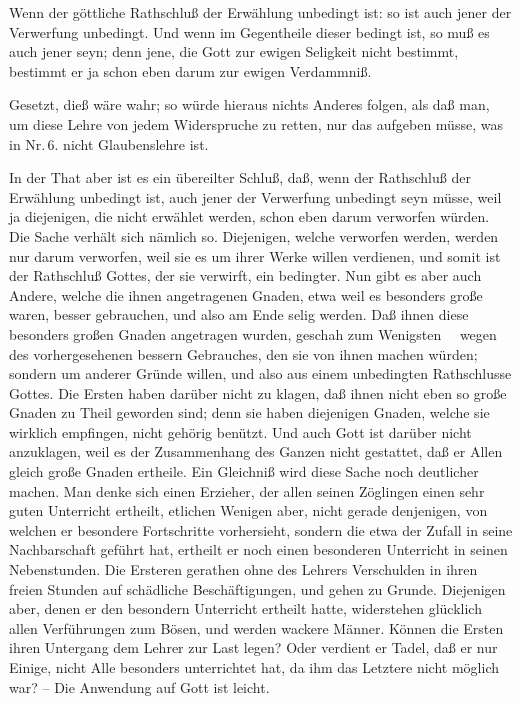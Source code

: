  Wenn der göttliche Rathschluß der Erwählung unbedingt ist: so ist auch jener der Verwerfung unbedingt. Und wenn im Gegentheile dieser bedingt ist, so muß es auch jener seyn; denn jene, die Gott zur ewigen Seligkeit nicht bestimmt, bestimmt er ja schon eben darum zur ewigen Verdammniß.\par
{} 
\begin{aufzb}[1.]
\item Gesetzt, dieß wäre wahr; so würde hieraus nichts Anderes folgen, als daß man, um diese Lehre von jedem Widerspruche zu retten, nur das aufgeben müsse, was in Nr.\,6. nicht Glaubenslehre ist.
\item In der That aber ist es ein übereilter Schluß, daß, wenn der Rathschluß der Erwählung unbedingt ist, auch jener der Verwerfung unbedingt seyn müsse, weil ja diejenigen, die nicht erwählet werden, schon eben darum verworfen würden. Die Sache verhält sich nämlich so. Diejenigen, welche verworfen werden, werden nur darum verworfen, weil sie es um ihrer Werke willen verdienen, und somit ist der Rathschluß Gottes, der sie verwirft, ein bedingter. Nun gibt es aber auch Andere, welche die ihnen angetragenen Gnaden, etwa weil es besonders große waren, besser gebrauchen, und also am Ende selig werden. Daß ihnen diese besonders großen Gnaden angetragen wurden, geschah zum Wenigsten ~\ wegen des vorhergesehenen bessern Gebrauches, den sie von ihnen machen würden; sondern um anderer Gründe willen, und also aus einem unbedingten Rathschlusse Gottes. Die Ersten haben darüber nicht zu klagen, daß ihnen nicht eben so große Gnaden zu Theil geworden sind; denn sie haben diejenigen Gnaden, welche sie wirklich empfingen, nicht gehörig benützt. Und auch Gott ist darüber nicht anzuklagen, weil es der Zusammenhang des Ganzen nicht gestattet, daß er Allen gleich große Gnaden ertheile. Ein Gleichniß wird diese Sache noch deutlicher machen. Man denke sich einen Erzieher, der allen seinen Zöglingen einen sehr guten Unterricht ertheilt, etlichen Wenigen aber, nicht gerade denjenigen, von welchen er besondere Fortschritte vorhersieht, sondern die etwa der Zufall in seine Nachbarschaft geführt hat, ertheilt er noch einen besonderen Unterricht in seinen Nebenstunden. Die Ersteren gerathen ohne des Lehrers Verschulden in ihren freien Stunden auf schädliche Beschäftigungen, und gehen zu Grunde. Diejenigen aber, denen er den besondern Unterricht ertheilt hatte, widerstehen glücklich allen Verführungen zum Bösen, und werden wackere Männer. Können die Ersten ihren Untergang dem Lehrer zur Last legen? Oder verdient er Tadel, daß er nur Einige, nicht Alle besonders unterrichtet hat, da ihm das Letztere nicht möglich war? -- Die Anwendung auf Gott ist leicht.
\end{aufzb}


